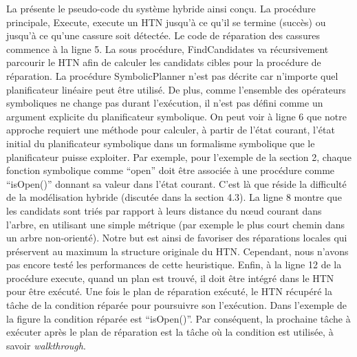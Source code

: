 \documentclass[a4paper,twoside,french]{article}
\begin{document}
		\par La  présente le pseudo-code du système hybride ainsi conçu. La procédure principale, {\sc Execute}, execute un HTN jusqu'à ce qu'il se termine (succès) ou jusqu'à ce qu'une cassure soit détectée. Le code de réparation des cassures commence à la ligne 5. La sous procédure, {\sc FindCandidates} va récursivement parcourir le HTN afin de calculer les candidats cibles pour la procédure de réparation. La procédure {\sc SymbolicPlanner} n'est pas décrite car n'importe quel planificateur linéaire peut être utilisé. De plus, comme l'ensemble des opérateurs symboliques ne change pas durant l'exécution, il n'est pas défini comme un argument explicite du planificateur symbolique. On peut voir à ligne 6 que notre approche requiert une méthode pour calculer, à partir de l'état courant, l'état initial du planificateur symbolique dans un formalisme symbolique que le planificateur puisse exploiter. Par exemple, pour l'exemple de la section 2, chaque fonction symbolique comme ``open'' doit être associée à une procédure comme ``isOpen()'' donnant sa valeur dans l'état courant. C'est là que réside la difficulté de la modélisation hybride (discutée dans la section 4.3). La ligne 8 montre que les candidats sont triés par rapport à leurs distance du n\oe ud courant dans l'arbre, en utilisant une simple métrique (par exemple le plus court chemin dans un arbre non-orienté). Notre but est ainsi de favoriser des réparations locales qui préservent au maximum la structure originale du HTN. Cependant, nous n'avons pas encore testé les performances de cette heuristique. Enfin, à la ligne 12 de la procédure {\sc execute}, quand un plan est trouvé, il doit être intégré dans le HTN pour être exécuté. Une fois le plan de réparation exécuté, le HTN récupéré la tâche de la condition réparée pour poursuivre son l'exécution. Dans l'exemple de la figure  la condition réparée est ``isOpen()''. Par conséquent, la prochaine tâche à exécuter après le plan de réparation est la tâche où la condition est utilisée, à savoir {\em walkthrough}.  
\end{document}
